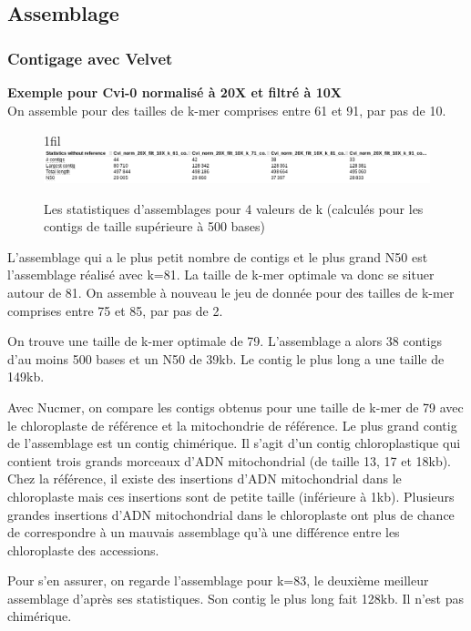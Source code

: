\documentclass[a4paper]{article}
\makeatletter
\newcommand*{\centerfloat}{%
  \parindent \z@
  \leftskip \z@ \@plus 1fil \@minus \textwidth
  \rightskip\leftskip
  \parfillskip \z@skip}
\makeatother
\begin{document}
\subsection{Assemblage}

\subsubsection{Contigage avec Velvet}
\hspace{1.5cm}  \textbf{\small Exemple pour Cvi-0 normalisé à 20X et filtré à 10X}\\

On assemble pour des tailles de k-mer comprises entre 61 et 91, par pas de 10. 

\begin{figure}[!ht]
\centerfloat
\includegraphics[scale=0.4] {Assemblage/quast.png}
\caption{Les statistiques d'assemblages pour 4 valeurs de k (calculés pour les contigs de taille supérieure à 500 bases)}
\label{quast}
\end{figure}

L'assemblage qui a le plus petit nombre de contigs et le plus grand N50 est l'assemblage réalisé avec k=81. La taille de k-mer optimale va donc se situer autour de 81. On assemble à nouveau le jeu de donnée pour des tailles de k-mer comprises entre 75 et 85, par pas de 2.

On trouve une taille de k-mer optimale de 79. L'assemblage a alors 38 contigs d'au moins 500 bases et un N50 de 39kb. Le contig le plus long a une taille de 149kb. 

Avec Nucmer, on compare les contigs obtenus pour une taille de k-mer de 79 avec le chloroplaste de référence et la mitochondrie de référence. Le plus grand contig de l'assemblage est un contig chimérique. Il s'agit d'un contig chloroplastique qui contient trois grands morceaux d'ADN mitochondrial (de taille 13, 17 et 18kb). Chez la référence, il existe des insertions d'ADN mitochondrial dans le chloroplaste  mais ces insertions sont de petite taille (inférieure à 1kb). Plusieurs grandes insertions d'ADN mitochondrial dans le chloroplaste ont plus de chance de correspondre à un mauvais assemblage qu'à une différence entre les chloroplaste des accessions. 

Pour s'en assurer, on regarde l'assemblage pour k=83, le deuxième meilleur assemblage d'après ses statistiques. Son contig le plus long fait 128kb. Il n'est pas chimérique.
\end{document}
